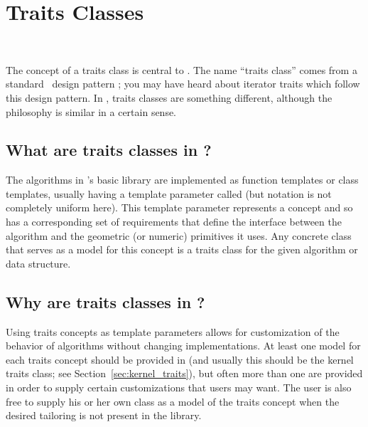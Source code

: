 
\chapter{Traits Classes}
\label{chap:traits_classes}
 \\

The concept of a traits class is central to \cgal. The name ``traits class'' 
comes from a standard \CC\ design pattern \cite{Myers95}; you may have heard
about iterator traits which follow this design pattern. In \cgal, traits
classes are something different, although the philosophy is similar in 
a certain sense. 

\section{What are traits classes in \cgal?} 
\label{sec:what_is_a_traits_class}

The algorithms in \cgal's basic library are implemented as function templates
or class templates, usually having a template parameter called  
(but notation is not completely uniform here). This template parameter 
represents a concept and so has a corresponding set of requirements that
define the interface between the algorithm and the geometric (or numeric) 
primitives it uses.  Any concrete class that serves as a model for this 
concept is a traits class for the given algorithm or data structure.

\section{Why are traits classes in \cgal?}
\label{sec:why_traits_classes}

Using traits concepts as template parameters allows for customization of 
the behavior of algorithms without changing implementations.
At least one model for each traits concept should be provided in
\cgal (and usually this should be the kernel traits class; see 
Section~\ref{sec:kernel_traits}), but often more than one are provided
in order to supply certain customizations that users may want.  The user 
is also free to supply his or her own class as a model of the traits
concept when the desired tailoring is not present in the library.

